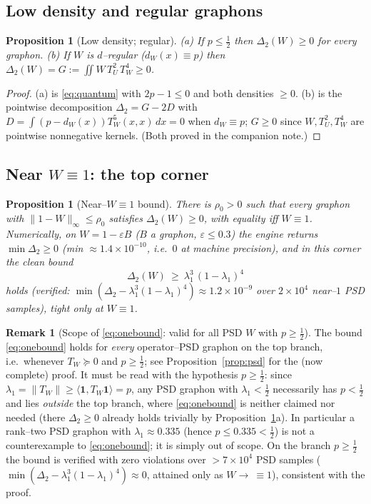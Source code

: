 \documentclass[11pt]{article}
\newtheorem{proposition}[theorem]{Proposition}
\theoremstyle{definition}
\newtheorem{remark}[theorem]{Remark}
\newcommand{\one}{\mathbf 1}
\newcommand{\tw}{T_W}
\newcommand{\tu}{T_U}
\newcommand{\Linf}[1]{\lVert #1\rVert_\infty}
\begin{document}
\subsection{Low density and regular graphons}

\begin{proposition}[Low density; regular]\label{prop:easy}
\textup{(a)} If $p\le\tfrac12$ then $\Delta_2(W)\ge0$ for every graphon.
\textup{(b)} If $W$ is $d$--regular ($d_W(x)\equiv p$) then
$\Delta_2(W)=G:=\iint W\,\tu^2\,\tw^4\ge0$.
\end{proposition}
\begin{proof}
(a) is \eqref{eq:quantum} with $2p-1\le0$ and both densities $\ge0$.  (b) is the
pointwise decomposition $\Delta_2=G-2D$ with
$D=\int(p-d_W(x))\tw^5(x,x)\,dx=0$ when $d_W\equiv p$; $G\ge0$ since $W,\tu^2,\tw^4$
are pointwise nonnegative kernels.  (Both proved in the companion note.)
\end{proof}

\subsection{Near $W\equiv1$: the top corner}

\begin{proposition}[Near--$W\equiv1$ bound]\label{prop:nearone}
There is $\rho_0>0$ such that every graphon with $\Linf{1-W}\le\rho_0$ satisfies
$\Delta_2(W)\ge0$, with equality iff $W\equiv1$.  Numerically, on
$W=1-\varepsilon B$ ($B$ a graphon, $\varepsilon\le0.3$) the engine returns
$\min\Delta_2\ge0$ (min $\approx1.4\times10^{-10}$, i.e.\ $0$ at machine precision),
and in this corner the clean bound
\begin{equation}\label{eq:onebound}
  \Delta_2(W)\ \ge\ \lambda_1^3\,(1-\lambda_1)^4
\end{equation}
holds (verified: $\min(\Delta_2-\lambda_1^3(1-\lambda_1)^4)\approx1.2\times10^{-9}$
over $2\times10^4$ near--$1$ PSD samples), tight only at $W\equiv1$.
\end{proposition}

\begin{remark}[Scope of \eqref{eq:onebound}: valid for all PSD $W$ with $p\ge\tfrac12$]\label{rem:onebound}
The bound \eqref{eq:onebound} holds for \emph{every} operator--PSD graphon on the
top branch, i.e.\ whenever $\tw\succeq0$ and $p\ge\tfrac12$; see
Proposition~\ref{prop:psd} for the (now complete) proof.  It must be read with the
hypothesis $p\ge\tfrac12$: since $\lambda_1=\|\tw\|\ge\langle\one,\tw\one\rangle=p$,
any PSD graphon with $\lambda_1<\tfrac12$ necessarily has $p<\tfrac12$ and lies
\emph{outside} the top branch, where \eqref{eq:onebound} is neither claimed nor
needed (there $\Delta_2\ge0$ already holds trivially by
Proposition~\ref{prop:easy}a).  In particular a rank--two PSD graphon with
$\lambda_1\approx0.335$ (hence $p\le0.335<\tfrac12$) is not a counterexample to
\eqref{eq:onebound}; it is simply out of scope.  On the branch $p\ge\tfrac12$ the
bound is verified with zero violations over $>7\times10^4$ PSD samples
($\min(\Delta_2-\lambda_1^3(1-\lambda_1)^4)\approx0$, attained only as
$W\to\ \equiv1$), consistent with the proof.
\end{remark}
\end{document}
